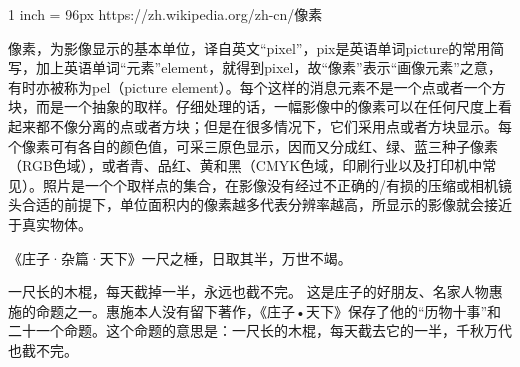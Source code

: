 \documentclass[main.tex]{subfiles}
\begin{document}
1 inch = 96px
https://zh.wikipedia.org/zh-cn/像素

像素，为影像显示的基本单位，译自英文“pixel”，pix是英语单词picture的常用简写，加上英语单词“元素”element，就得到pixel，故“像素”表示“画像元素”之意，有时亦被称为pel（picture element）。每个这样的消息元素不是一个点或者一个方块，而是一个抽象的取样。仔细处理的话，一幅影像中的像素可以在任何尺度上看起来都不像分离的点或者方块；但是在很多情况下，它们采用点或者方块显示。每个像素可有各自的颜色值，可采三原色显示，因而又分成红、绿、蓝三种子像素（RGB色域），或者青、品红、黄和黑（CMYK色域，印刷行业以及打印机中常见）。照片是一个个取样点的集合，在影像没有经过不正确的/有损的压缩或相机镜头合适的前提下，单位面积内的像素越多代表分辨率越高，所显示的影像就会接近于真实物体。


《庄子·杂篇·天下》一尺之棰，日取其半，万世不竭。

一尺长的木棍，每天截掉一半，永远也截不完。
这是庄子的好朋友、名家人物惠施的命题之一。惠施本人没有留下著作，《庄子•天下》保存了他的“历物十事”和二十一个命题。这个命题的意思是：一尺长的木棍，每天截去它的一半，千秋万代也截不完。
\end{document}
